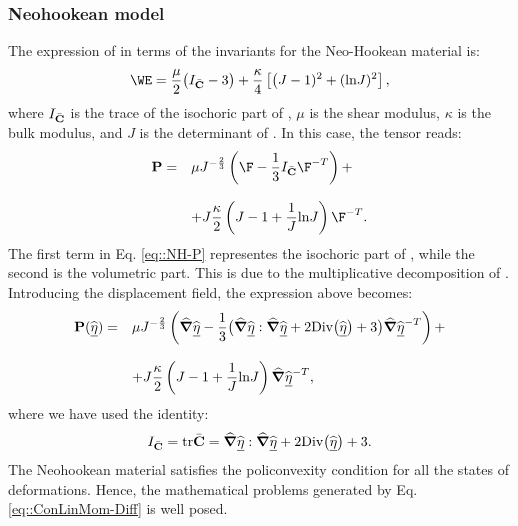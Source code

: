 \subsubsection{Neohookean model} The expression of \W in terms of the
invariants for the Neo-Hookean material is:
\begin{equation}
  \WE=\frac{\mu}{2}\big(I_{\Cbar}-3\big)+\frac{\kappa}{4}\left[\big(J-1)^2
    + (\text{ln}J)^2\right],
  \label{eq::strainNH}
\end{equation} where $I_{\bar{\textbf{C}}}$ is the trace of the isochoric part of
\C, $\mu$ is the shear modulus, $\kappa$ is the bulk modulus, and $J$
is the determinant of \F. In this case, the tensor \Piola reads:
\begin{equation}
  \begin{array}{lll} \Piola = & \displaystyle \mu
    J^{-\frac{2}{3}}\left(\F-\frac{1}{3}I_{\Cbar}\F^{-T}\right) +\\ \\ &
    \displaystyle +
    J\frac{\kappa}{2}\left(J-1+\frac{1}{J}\text{ln}J\right)\F^{-T}.
  \end {array}
  \label{eq::NH-P}
\end{equation} The first term in Eq. \eqref{eq::NH-P} representes the
isochoric part of \Piola, while the second is the volumetric
part. This is due to the multiplicative decomposition of
\F. Introducing the displacement field, the expression above becomes:
\begin{equation}
  \begin{array}{lll} \textbf{P}(\widehat{\underline{\eta}}) = & \displaystyle \mu
    J^{-\frac{2}{3}}\left(\widehat{\boldsymbol{\nabla}}\widehat{\underline{\eta}} -
      \frac{1}{3}\big(\widehat{\boldsymbol{\nabla}}\widehat{\underline{\eta}}:\widehat{\boldsymbol{\nabla}}\widehat{\underline{\eta}}+2\text{Div}\big(\widehat{\underline{\eta}}\big)+3\big)\widehat{\boldsymbol{\nabla}}\widehat{\underline{\eta}}^{-T}\right)+\\
    \\ & \displaystyle +
    J\frac{\kappa}{2}\left(J-1+\frac{1}{J}\text{ln}J\right)\widehat{\boldsymbol{\nabla}}\widehat{\underline{\eta}}^{-T},
  \end{array}
  \label{eq::NH-P-displ}
\end{equation} where we have used the identity:
\begin{equation} I_{\bar{\textbf{C}}}=\text{tr}\bar{\textbf{C}}=\widehat{\boldsymbol{\nabla}}\widehat{\underline{\eta}}:\widehat{\boldsymbol{\nabla}}\widehat{\underline{\eta}}
  + 2\text{Div}\big(\widehat{\underline{\eta}}\big)+3.
  \label{eq::Id-trC-displ}
\end{equation} The Neohookean material satisfies the policonvexity
condition for all the states of deformations. Hence, the mathematical
problems generated by Eq. \eqref{eq::ConLinMom-Diff} is well posed.

